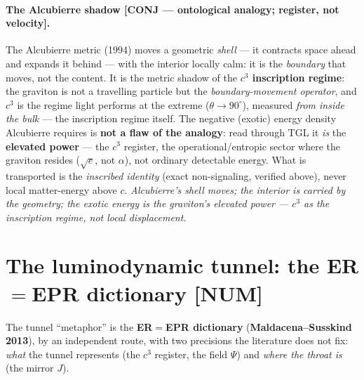 \documentclass[11pt]{article}
\theoremstyle{definition}\newtheorem{deriv}{Derivation}
\begin{document}
\paragraph{The Alcubierre shadow \textsf{[CONJ --- ontological analogy; register, not velocity]}.} The Alcubierre metric (1994) moves a geometric \emph{shell} --- it contracts space ahead and expands it behind --- with the interior locally calm: it is the \emph{boundary} that moves, not the content. It is the metric shadow of the \textbf{$c^3$ inscription regime}: the graviton is not a travelling particle but the \emph{boundary-movement operator}, and $c^3$ is the regime light performs at the extreme ($\theta\to90^\circ$), measured \emph{from inside the bulk} --- the inscription regime itself. The negative (exotic) energy density Alcubierre requires is \textbf{not a flaw of the analogy}: read through TGL it \emph{is} the \textbf{elevated power} --- the $c^3$ register, the operational/entropic sector where the graviton resides ($\sqrt e$, not $\alpha$), not ordinary detectable energy. What is transported is the \emph{inscribed identity} (exact non-signaling, verified above), never local matter-energy above $c$. \emph{Alcubierre's shell moves; the interior is carried by the geometry; the exotic energy is the graviton's elevated power --- $c^3$ as the inscription regime, not local displacement.}

\section{The luminodynamic tunnel: the ER$=$EPR dictionary \textsf{[NUM]}}

The tunnel ``metaphor'' is the \textbf{ER$=$EPR dictionary} (\textbf{Maldacena--Susskind 2013}), by an independent route, with two precisions the literature does not fix: \emph{what} the tunnel represents (the $c^3$ register, the field $\Psi$) and \emph{where the throat is} (the mirror $J$).
\end{document}
